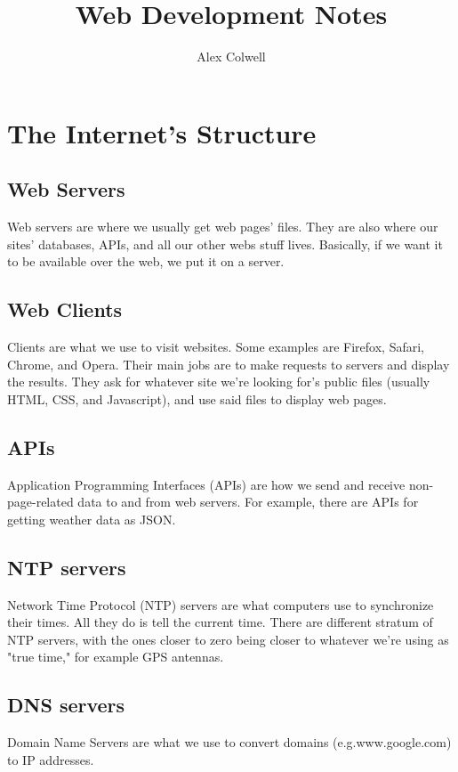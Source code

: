 \documentclass[a4paper,12pt,titlepage,oneside,final]{book}
\title{Web Development Notes}
\author{Alex Colwell}
\begin{document}
\maketitle
\tableofcontents

\chapter{The Internet's Structure}

\section{Web Servers}
Web servers are where we usually get web pages' files. They are also where our sites' databases, APIs, and all our other webs stuff lives. Basically, if we want it to be available over the web, we put it on a server.

\section{Web Clients}
Clients are what we use to visit websites. Some examples are Firefox, Safari, Chrome, and Opera. Their main jobs are to make requests to servers and display the results. They ask for whatever site we're looking for's public files (usually HTML, CSS, and Javascript), and use said files to display web pages.

\section{APIs}
Application Programming Interfaces (APIs) are how we send and receive non-page-related data to and from web servers. For example, there are APIs for getting weather data as JSON.

\section{NTP servers}

Network Time Protocol (NTP) servers are what computers use to synchronize their times. All they do is tell the current time. There are different stratum of NTP servers, with the ones closer to zero being closer to whatever we're using as "true time," for example GPS antennas.  

\section{DNS servers}
Domain Name Servers are what we use to convert domains (e.g.www.google.com) to IP addresses. 
\end{document}
